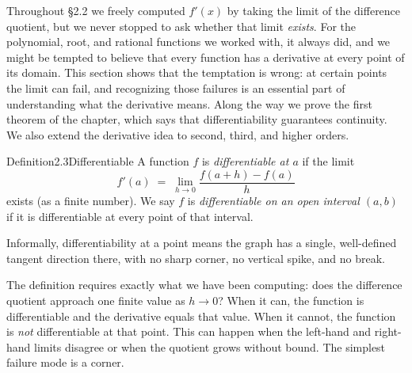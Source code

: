 \documentclass[a4paper,12pt,oneside]{memoir}
\begin{document}
Throughout §2.2 we freely computed \(f'(x)\) by taking the limit of the difference quotient, but we never stopped to ask whether that limit \emph{exists}. For the polynomial, root, and rational functions we worked with, it always did, and we might be tempted to believe that every function has a derivative at every point of its domain. This section shows that the temptation is wrong: at certain points the limit can fail, and recognizing those failures is an essential part of understanding what the derivative means. Along the way we prove the first theorem of the chapter, which says that differentiability guarantees continuity. We also extend the derivative idea to second, third, and higher orders.

\begin{envdefinition}{Definition}{2.3}{Differentiable}
A function \(f\) is \emph{differentiable at \(a\)} if the limit \[ f'(a) \;=\; \lim_{h \to 0} \frac{f(a + h) - f(a)}{h} \] exists (as a finite number). We say \(f\) is \emph{differentiable on an open interval \((a, b)\)} if it is differentiable at every point of that interval.

\begin{informal}
Informally, differentiability at a point means the graph has a single, well-defined tangent direction there, with no sharp corner, no vertical spike, and no break.
\end{informal}
\end{envdefinition}
The definition requires exactly what we have been computing: does the difference quotient approach one finite value as \(h \to 0\)? When it can, the function is differentiable and the derivative equals that value. When it cannot, the function is \emph{not} differentiable at that point. This can happen when the left-hand and right-hand limits disagree or when the quotient grows without bound. The simplest failure mode is a corner.
\end{document}
